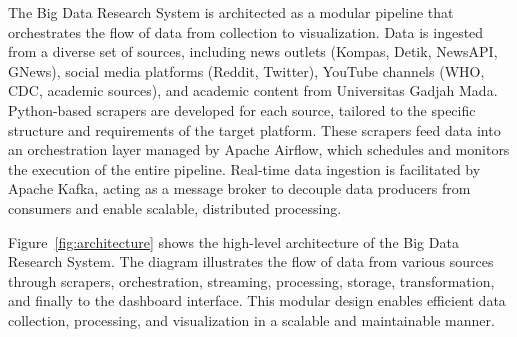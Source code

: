 \documentclass[a4paper]{article}
\theoremstyle{plain}
\theoremstyle{definition}
\begin{document}
The Big Data Research System is architected as a modular pipeline that orchestrates the flow of data from collection to visualization. Data is ingested from a diverse set of sources, including news outlets (Kompas, Detik, NewsAPI, GNews), social media platforms (Reddit, Twitter), YouTube channels (WHO, CDC, academic sources), and academic content from Universitas Gadjah Mada. Python-based scrapers are developed for each source, tailored to the specific structure and requirements of the target platform. These scrapers feed data into an orchestration layer managed by Apache Airflow, which schedules and monitors the execution of the entire pipeline. Real-time data ingestion is facilitated by Apache Kafka, acting as a message broker to decouple data producers from consumers and enable scalable, distributed processing.

Figure~\ref{fig:architecture} shows the high-level architecture of the Big Data Research System. The diagram illustrates the flow of data from various sources through scrapers, orchestration, streaming, processing, storage, transformation, and finally to the dashboard interface. This modular design enables efficient data collection, processing, and visualization in a scalable and maintainable manner.
\end{document}
